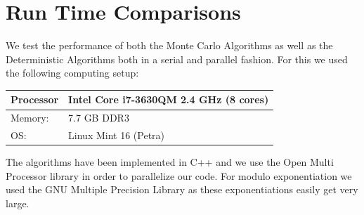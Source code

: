 \documentclass[compressed,final,notitlepage,narroweqnarray,inline,twoside,]{ieee}
\begin{document}
\section{Run Time Comparisons}
We test the performance of both the Monte Carlo Algorithms as well as the Deterministic Algorithms both in a serial and parallel fashion. For this we used the following computing setup:
\begin{tabular}{l|l}
\hline
Processor & Intel Core i7-3630QM 2.4 GHz (8 cores)\\\hline
Memory: & 7.7 GB DDR3 \\\hline
OS: & Linux Mint 16 (Petra)\\\hline
\end{tabular}
The algorithms have been implemented in C++ and we use the Open Multi Processor library \cite{OMP} in order to parallelize our code. For modulo exponentiation we used the GNU Multiple Precision Library \cite{GMP} as these exponentiations easily get very large.
\end{document}
